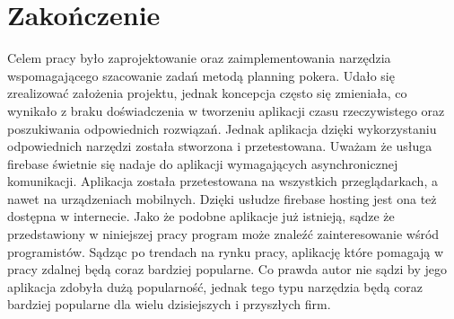 \chapter*{Zakończenie}

Celem pracy było zaprojektowanie oraz zaimplementowania narzędzia wspomagającego szacowanie zadań metodą planning pokera.
Udało się zrealizować założenia projektu, jednak koncepcja często się zmieniała,
co wynikało z braku doświadczenia w tworzeniu aplikacji czasu rzeczywistego oraz poszukiwania odpowiednich rozwiązań.
Jednak aplikacja dzięki wykorzystaniu odpowiednich narzędzi została stworzona i przetestowana.
Uważam że usługa firebase świetnie się nadaje do aplikacji wymagających asynchronicznej komunikacji.
Aplikacja została przetestowana na wszystkich przeglądarkach, a nawet na urządzeniach mobilnych.
Dzięki usłudze firebase hosting jest ona też dostępna w internecie.
Jako że podobne aplikacje już istnieją,
sądze że przedstawiony w niniejszej pracy program może znaleźć zainteresowanie wśród programistów.
Sądząc po trendach na rynku pracy, aplikację które pomagają w pracy zdalnej będą coraz bardziej popularne.
Co prawda autor nie sądzi by jego aplikacja zdobyła dużą popularność,
 jednak tego typu narzędzia będą coraz bardziej popularne dla wielu dzisiejszych i przyszłych firm.